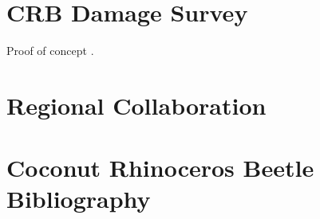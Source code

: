 \documentclass[12pt,letterpaper,english]{scrartcl}
\begin{document}
\newpage
\section{CRB Damage Survey}

Proof of concept \parencite{moore_training_2019}.

\newpage
\section{Regional Collaboration}

\newpage
\printbibliography

\appendix


\newpage
\section{Coconut Rhinoceros Beetle Bibliography}
\end{document}
